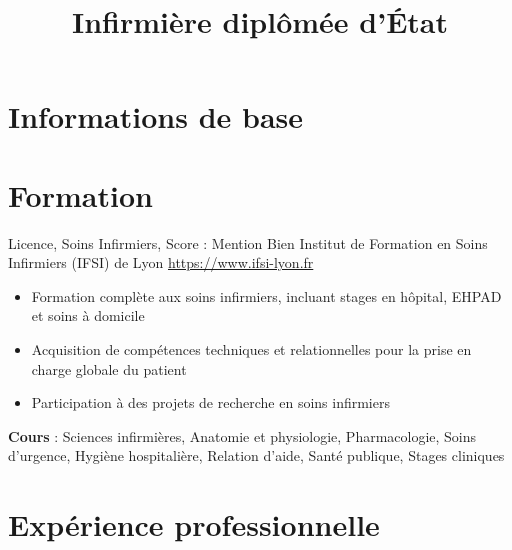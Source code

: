 \documentclass[a4paper, serif, 10pt]{moderncv}
\title{Infirmière diplômée d'État}
\begin{document}
\maketitle

\section{Informations de base}

\section{Formation}

        {Licence, Soins Infirmiers, Score : Mention Bien}
        {Institut de Formation en Soins Infirmiers (IFSI) de Lyon}
        {\url{https://www.ifsi-lyon.fr}}
        {}
        {\begin{itemize}
\item Formation complète aux soins infirmiers, incluant stages en hôpital, EHPAD et soins à domicile
\item Acquisition de compétences techniques et relationnelles pour la prise en charge globale du patient
\item Participation à des projets de recherche en soins infirmiers
\end{itemize}
\textbf{Cours} : Sciences infirmières, Anatomie et physiologie, Pharmacologie, Soins d'urgence, Hygiène hospitalière, Relation d'aide, Santé publique, Stages cliniques}
\section{Expérience professionnelle}
\end{document}
